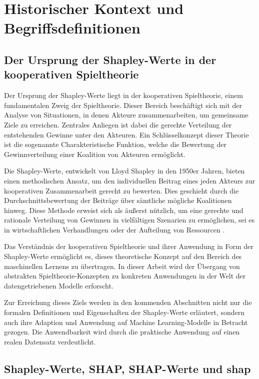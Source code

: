 \chapter{Historischer Kontext und Begriffsdefinitionen}



\section{Der Ursprung der Shapley-Werte in der kooperativen Spieltheorie}

Der Ursprung der Shapley-Werte liegt in der kooperativen Spieltheorie, einem fundamentalen Zweig der Spieltheorie. 
Dieser Bereich beschäftigt sich mit der Analyse von Situationen, in denen Akteure zusammenarbeiten, um gemeinsame Ziele zu erreichen. 
Zentrales Anliegen ist dabei die gerechte Verteilung der entstehenden Gewinne unter den Akteuren. Ein Schlüsselkonzept dieser Theorie 
ist die sogenannte \glqq{}Charakteristische Funktion\grqq{}, welche die Bewertung der Gewinnverteilung einer Koalition von Akteuren ermöglicht.

Die Shapley-Werte, entwickelt von Lloyd Shapley in den 1950er Jahren, bieten einen methodischen Ansatz, um den individuellen Beitrag 
eines jeden Akteurs zur kooperativen Zusammenarbeit gerecht zu bewerten. Dies geschieht durch die Durchschnittsbewertung der Beiträge 
über sämtliche mögliche Koalitionen hinweg. Diese Methode erweist sich als äußerst nützlich, um eine gerechte und rationale Verteilung 
von Gewinnen in vielfältigen Szenarien zu ermöglichen, sei es in wirtschaftlichen Verhandlungen oder der Aufteilung von Ressourcen \cite[S. 215]{Molnar_2022}.

Das Verständnis der kooperativen Spieltheorie und ihrer Anwendung in Form der Shapley-Werte ermöglicht es, dieses theoretische Konzept 
auf den Bereich des maschinellen Lernens zu übertragen. In dieser Arbeit wird der Übergang von abstrakten Spieltheorie-Konzepten 
zu konkreten Anwendungen in der Welt der datengetriebenen Modelle erforscht.

Zur Erreichung dieses Ziels werden in den kommenden Abschnitten nicht nur die formalen Definitionen und Eigenschaften der Shapley-Werte 
erläutert, sondern auch ihre Adaption und Anwendung auf Machine Learning-Modelle in Betracht gezogen. Die Anwendbarkeit wird durch die 
praktische Anwendung auf einen realen Datensatz verdeutlicht.


\section{Shapley-Werte, SHAP, SHAP-Werte und \textsf{shap}}

